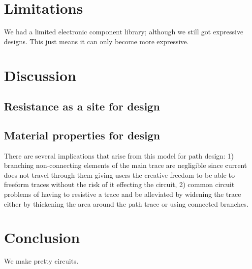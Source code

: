 \documentclass{sigchi}
\begin{document}
\section{Limitations}
  We had a limited electronic component library; although we still got expressive designs. This just means it can only become more expressive. 


\section {Discussion}

  \subsection{Resistance as a site for design}
   

\subsection{Material properties for design}
    
    There are several implications that arise from this model for path design: 1) branching non-connecting elements of the main trace are negligible since current does not travel through them giving users the creative freedom to be able to freeform traces without the risk of it effecting the circuit, 2) common circuit problems of having to resistive a trace and be alleviated by widening the trace either by thickening the area around the path trace or using connected branches. 
\section {Conclusion}
We make pretty circuits. 


\balance



\end{document}
